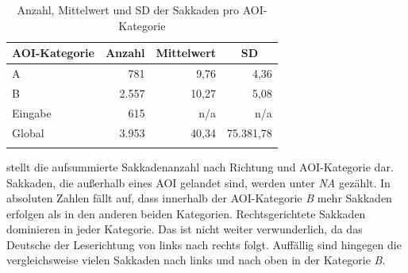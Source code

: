 \begin{table}
    \begin{tabular}{lrrr}  
     \lsptoprule
        {AOI-Kategorie} & \multicolumn{1}{c}{Anzahl} & \multicolumn{1}{c}{Mittelwert} & \multicolumn{1}{c}{SD} \\ 
        \midrule
        A  & 781 & 9,76 & 4,36 \\ 
        B  & 2.557 & 10,27 & 5,08\\ 
        Eingabe   & 615 & n/a & n/a\\ 
        \midrule
        Global & 3.953 & 40,34 & 75.381,78\\ 
        \lspbottomrule
    \end{tabular}
    \caption{Anzahl, Mittelwert und SD der Sakkaden pro AOI-Ka\-te\-go\-rie\label{K6:tab:DeDe:sacspecs}}
\end{table}



 stellt die aufsummierte Sakkadenanzahl nach Richtung und AOI-Kategorie dar. Sakkaden, die außerhalb eines AOI gelandet sind, werden unter \emph{NA} gezählt. In absoluten Zahlen fällt auf, dass innerhalb der AOI-Kategorie \emph{B} mehr Sakkaden erfolgen als in den anderen beiden Kategorien. Rechtsgerichtete Sakkaden dominieren in jeder Kategorie. Das ist nicht weiter verwunderlich, da das Deutsche der Leserichtung von links nach rechts folgt. Auffällig sind hingegen die vergleichsweise vielen Sakkaden nach links und nach oben in der Kategorie \emph{B}.



